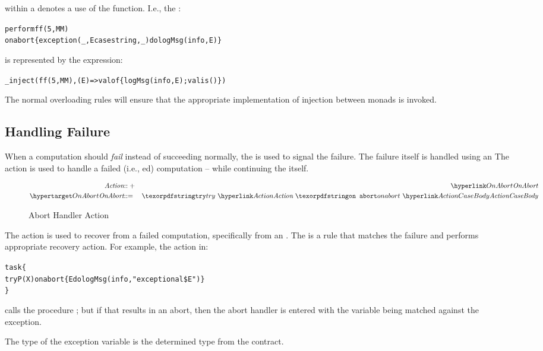 \begin{aside}
 within a  denotes a use of the  function. I.e., the :
\begin{alltt}
perform ff(5,MM)
    on abort \{ exception(_,E case string,_) do logMsg(info,E) \}
\end{alltt}
is represented by the expression:
\begin{alltt}
\_inject(ff(5,MM), (E) => valof\{ logMsg(info,E); valis () \})
\end{alltt}
The normal overloading rules will ensure that the appropriate implementation of injection between monads is invoked.
\end{aside}

\subsection{Handling Failure}
\label{failAction}

When a computation should \emph{fail} instead of succeeding normally, the  is used to signal the failure. The failure itself is handled using an 
The  action is used to handle a failed (i.e., ed) computation -- while continuing the  itself.

\begin{figure}[hbtp]
\begin{eqnarray*}
\emph{Action}&\arrowplus&\ntRef{OnAbort}\\
\ntDef{OnAbort}&\arrow&\q{try}\ \ntRef{Action}\ \q{on abort}\ \ntRef{ActionCaseBody}
\end{eqnarray*}
\caption{Abort Handler Action}
\label{failHandleFig}
\end{figure}

The  action is used to recover from a failed computation, specifically from an . The  is a rule that matches the failure and performs appropriate recovery action. For example, the action in:
\begin{alltt}
task\{
  try P(X) on abort \{ E do logMsg(info,"exceptional \$E") \}
\}
\end{alltt}
calls the procedure ; but if that results in an abort, then the abort handler is entered with the variable  being matched against the exception. 

The type of the exception variable is the determined type from the  contract.

